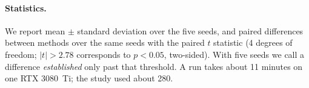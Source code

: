 \paragraph{Statistics.}
We report mean $\pm$ standard deviation over the five seeds, and paired differences between
methods over the same seeds with the paired $t$ statistic (4 degrees of freedom; $|t| > 2.78$
corresponds to $p < 0.05$, two-sided). With five seeds we call a difference \emph{established} only
past that threshold. A run takes about 11 minutes on one RTX 3080~Ti; the study used about 280.
